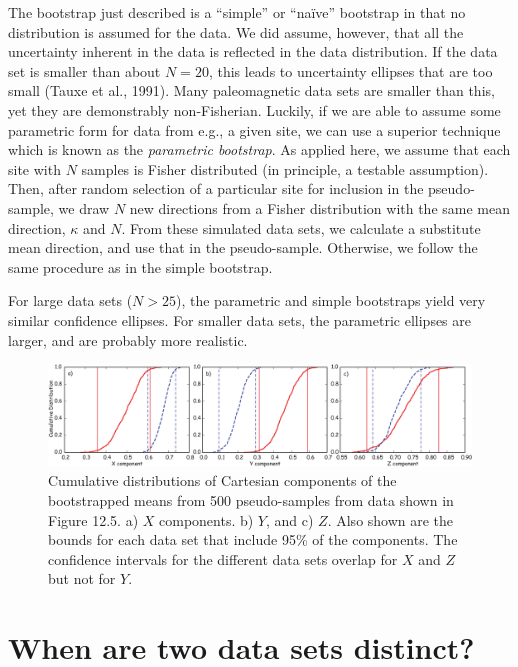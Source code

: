 The bootstrap just described is a  ``simple'' or ``na\"ive'' bootstrap in that
no distribution is assumed for the data.  We did assume, however, that all the
uncertainty inherent in the data is reflected in the data distribution.
 If the data set is smaller than about $N=20$, this leads to
uncertainty ellipses that are too small  
(Tauxe et al., 1991).  \nocite{tauxe91}
Many paleomagnetic data sets are smaller than this,  yet they
are demonstrably non-Fisherian.  Luckily, if we are able to assume some
parametric form for  data from e.g.,  a given site, we can use a superior
technique which is known as the 
{\it parametric bootstrap}.  As applied here, we assume
that each site with $N$ samples is Fisher distributed (in principle,
a testable assumption).
Then, after random selection of a particular site for inclusion in the 
pseudo-sample, we draw $N$ new directions from a Fisher distribution with the
same mean direction, $\kappa$ and $N$. From these simulated data sets, we calculate a 
substitute mean direction, and use that
in the pseudo-sample.  Otherwise, we follow the same procedure as
in the simple bootstrap.

For large data sets ($N>25$), the parametric and simple bootstraps yield
very similar confidence ellipses.   For smaller data sets, the parametric ellipses
are larger, and are probably more realistic.  


\begin{figure}[htb]
\centering  \includegraphics[width=14.5 cm]{EPSfiles/cdf.eps}
\caption{
Cumulative distributions of 
Cartesian  components  of the bootstrapped means from 500 pseudo-samples from data shown in Figure 12.5. a) $X$ components.  b) $ Y$, and c) $Z$.
Also shown are the bounds for each data set that include 95\% of the 
components.
The confidence intervals for the different data sets 
overlap for $X$ and $Z$ but not for $Y$.  
  }
  \label{fig:cdf}
  \end{figure}


\section{When are two data sets distinct?}
 

